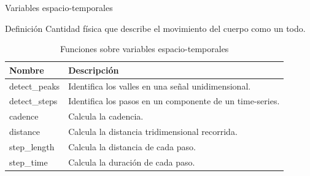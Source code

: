 \documentclass[aspectratio=169,spanish]{beamer} %
\newcommand{\mono}[1]{{\ttfamily #1}}
\begin{document}
\begin{frame}{Variables espacio-temporales}
    \begin{block}{Definición}
        Cantidad física que describe el movimiento del cuerpo como un todo. 
    \end{block}
\begin{table}
    \centering
    \caption{Funciones sobre variables espacio-temporales}
    \label{tab:space-tmp}
    \scriptsize
    \begin{tabular}{ll}
        \toprule
        Nombre & Descripción \\
        \midrule
        \mono{detect\_peaks} & Identifica los valles en una señal unidimensional. \\
        \mono{detect\_steps} & Identifica los pasos en un componente de un time-series. \\
        \mono{cadence} & Calcula la cadencia. \\
        \mono{distance} & Calcula la distancia tridimensional recorrida. \\
        \mono{step\_length} & Calcula la distancia de cada paso. \\
        \mono{step\_time} & Calcula la duración de cada paso. \\
        \bottomrule
    \end{tabular}
\end{table}
\end{frame}
\end{document}
